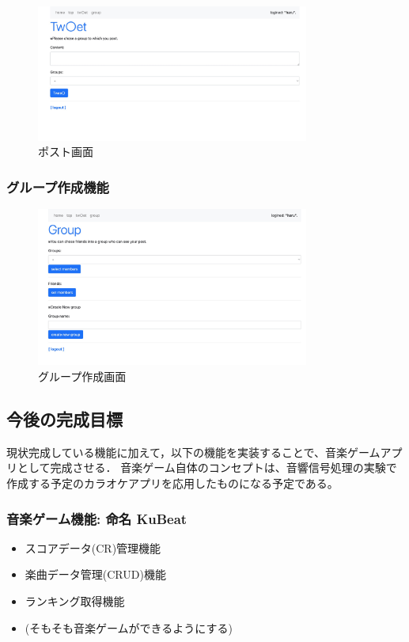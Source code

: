 \documentclass[a4j]{jarticle}
\begin{document}
\begin{figure}[htbp]
  \centering
  \includegraphics[width=0.8\textwidth,bb=0 0 800 600]{img/tweet.jpg}
  \caption{ポスト画面}
\end{figure}

\subsubsection{グループ作成機能}
\begin{figure}[htbp]
  \centering
  \includegraphics[width=0.8\textwidth,bb=0 0 800 600]{img/circle.jpg}
  \caption{グループ作成画面}
\end{figure}
\clearpage
\subsection{今後の完成目標}
現状完成している機能に加えて，以下の機能を実装することで、音楽ゲームアプリとして完成させる．
音楽ゲーム自体のコンセプトは、音響信号処理の実験で作成する予定のカラオケアプリを応用したものになる予定である。
\subsubsection*{音楽ゲーム機能: 命名 KuBeat}
\begin{itemize}
  \item スコアデータ(CR)管理機能
  \item 楽曲データ管理(CRUD)機能
  \item ランキング取得機能
  \item (そもそも音楽ゲームができるようにする)
\end{itemize}
\end{document}
